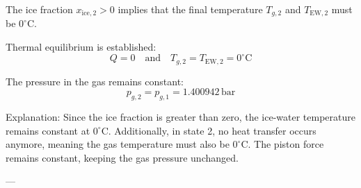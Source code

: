 The ice fraction \( x_{\text{ice},2} > 0 \) implies that the final temperature \( T_{g,2} \) and \( T_{\text{EW},2} \) must be \( 0^\circ\text{C} \).  

Thermal equilibrium is established:  
\[
Q = 0 \quad \text{and} \quad T_{g,2} = T_{\text{EW},2} = 0^\circ\text{C}
\]  

The pressure in the gas remains constant:  
\[
p_{g,2} = p_{g,1} = 1.400942 \, \text{bar}
\]  

Explanation: Since the ice fraction is greater than zero, the ice-water temperature remains constant at \( 0^\circ\text{C} \). Additionally, in state 2, no heat transfer occurs anymore, meaning the gas temperature must also be \( 0^\circ\text{C} \). The piston force remains constant, keeping the gas pressure unchanged.  

---
